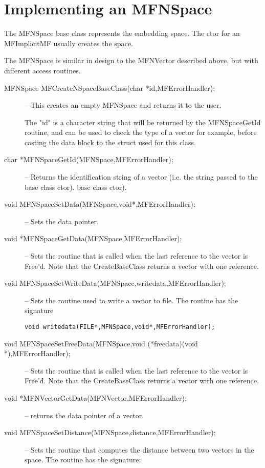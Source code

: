 \documentclass[12pt]{article}
\begin{document}
\section{Implementing an MFNSpace}

The {MFNSpace} base class represents the embedding space. The ctor for an {MFImplicitMF}
usually creates the space.

The {MFNSpace} is similar in design to the {MFNVector} described above, but with different
access routines.
\begin{description}
\item [MFNSpace MFCreateNSpaceBaseClass(char *id,MFErrorHandler);] --
 This creates an empty MFNSpace and returns it to the user.

 The "id" is a character string
 that will be returned by the {MFNSpaceGetId} routine, and can be used to check the type
 of a vector for example, before casting the data block to the struct used for this class.
\item [char *MFNSpaceGetId(MFNSpace,MFErrorHandler);]
-- Returns the identification string of a vector (i.e. the string passed to the base class ctor).
base class ctor).
\item [void MFNSpaceSetData(MFNSpace,void*,MFErrorHandler);]
-- Sets the data pointer.
\item [void *MFNSpaceGetData(MFNSpace,MFErrorHandler);] -- Sets the
 routine that is called when the last reference to the vector is Free'd.
 Note that the {CreateBaseClass} returns a vector with one reference.
\item [void MFNSpaceSetWriteData(MFNSpace,writedata,MFErrorHandler);]
 -- Sets the routine used to write a vector to file. The routine has the signature
\begin{verbatim}
void writedata(FILE*,MFNSpace,void*,MFErrorHandler);
\end{verbatim}
\item [void MFNSpaceSetFreeData(MFNSpace,void (*freedata)(void *),MFErrorHandler);]
 -- Sets the routine that is called when the last reference to the vector is Free'd.
 Note that the {CreateBaseClass} returns a vector with one reference.
\item [void *MFNVectorGetData(MFNVector,MFErrorHandler);] -- returns the data pointer of a vector.
\item [void MFNSpaceSetDistance(MFNSpace,distance,MFErrorHandler);]
-- Sets the routine that computes the distance between two vectors in the space. The
routine has the signature:
\begin{center}

\end{center}
\end{description}
\end{document}
